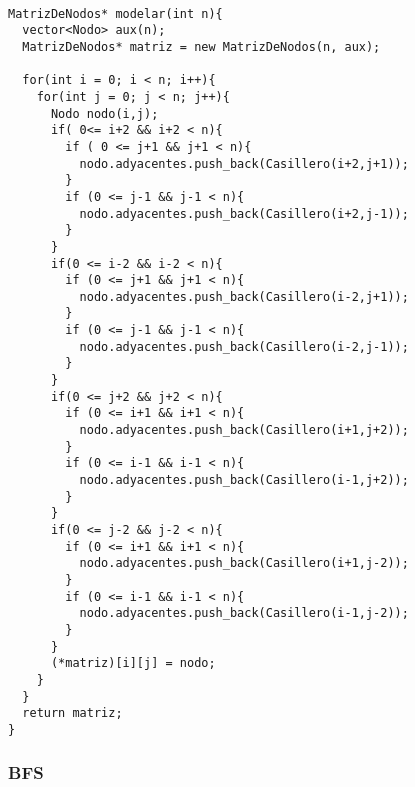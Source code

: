 \begin{lstlisting}

MatrizDeNodos* modelar(int n){
  vector<Nodo> aux(n);
  MatrizDeNodos* matriz = new MatrizDeNodos(n, aux);

  for(int i = 0; i < n; i++){
    for(int j = 0; j < n; j++){
      Nodo nodo(i,j);
      if( 0<= i+2 && i+2 < n){
        if ( 0 <= j+1 && j+1 < n){
          nodo.adyacentes.push_back(Casillero(i+2,j+1));
        }
        if (0 <= j-1 && j-1 < n){
          nodo.adyacentes.push_back(Casillero(i+2,j-1));
        }
      }
      if(0 <= i-2 && i-2 < n){
        if (0 <= j+1 && j+1 < n){
          nodo.adyacentes.push_back(Casillero(i-2,j+1));
        }
        if (0 <= j-1 && j-1 < n){
          nodo.adyacentes.push_back(Casillero(i-2,j-1));
        }
      }
      if(0 <= j+2 && j+2 < n){
        if (0 <= i+1 && i+1 < n){
          nodo.adyacentes.push_back(Casillero(i+1,j+2));
        }
        if (0 <= i-1 && i-1 < n){
          nodo.adyacentes.push_back(Casillero(i-1,j+2));
        }
      }
      if(0 <= j-2 && j-2 < n){
        if (0 <= i+1 && i+1 < n){
          nodo.adyacentes.push_back(Casillero(i+1,j-2));
        }
        if (0 <= i-1 && i-1 < n){
          nodo.adyacentes.push_back(Casillero(i-1,j-2));
        }
      }
      (*matriz)[i][j] = nodo;
    }
  }
  return matriz;
}

\end{lstlisting}

\subsubsection{BFS}

